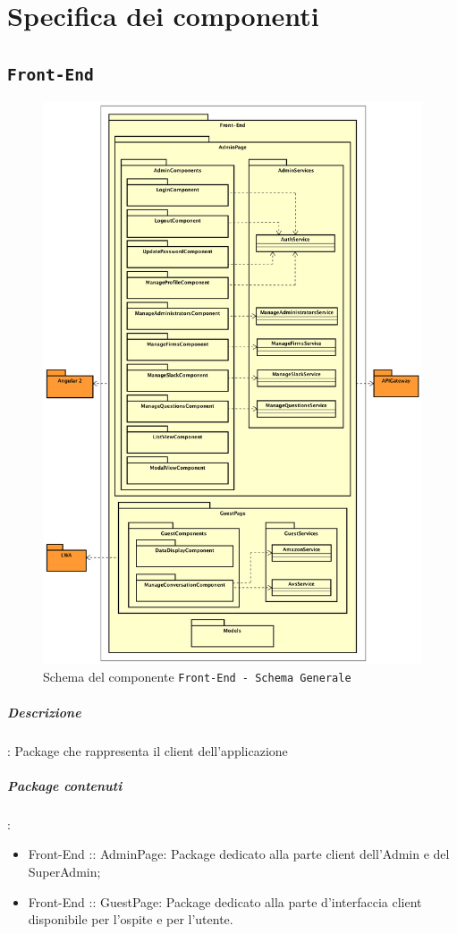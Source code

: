 \documentclass[../DefinizioneDiProdotto_v3.0.0.tex]{subfiles}
\begin{document}
\section{Specifica dei componenti}

\subsection{\texttt{Front-End}}
		\begin{figure}[!h]
			\centering
			\includegraphics[scale=0.4]{Architettura/Front-end.png}
			\caption{Schema del componente \texttt{Front-End - Schema Generale}}
		\end{figure}
		\subparagraph{Descrizione}: Package che rappresenta il client dell'applicazione
		\subparagraph{Package contenuti}:
		\begin{itemize}
			\item Front-End :: AdminPage: Package dedicato alla parte client dell'Admin e del SuperAdmin;
			\item Front-End :: GuestPage: Package dedicato alla parte d'interfaccia client disponibile per l'ospite e per l'utente.
		\end{itemize}
\end{document}
